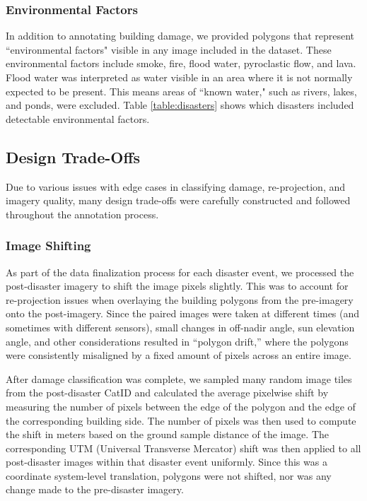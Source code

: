 \documentclass[10pt,twocolumn,letterpaper]{article}
\begin{document}
\vspace{-0.2cm}
\subsubsection{Environmental Factors}
In addition to annotating building damage, we provided polygons that represent ``environmental factors" visible in any image included in the dataset.
These environmental factors include smoke, fire, flood water, pyroclastic flow, and lava.
Flood water was interpreted as water visible in an area where it is not normally expected to  be present.
This means areas of ``known water," such as rivers, lakes, and ponds, were excluded.
Table \ref{table:disasters} shows which disasters included detectable environmental factors.

\subsection{Design Trade-Offs}
Due to various issues with edge cases in classifying damage, re-projection, and imagery quality, many design trade-offs were carefully constructed and followed throughout the annotation process.

\vspace{-0.2cm}
\subsubsection{Image Shifting}
As part of the data finalization process for each disaster event, we processed the post-disaster imagery to shift the image pixels slightly.
This was to account for re-projection issues when overlaying the building polygons from the pre-imagery onto the post-imagery.
Since the paired images were taken at different times (and sometimes with different sensors), small changes in off-nadir angle, sun elevation angle, and other considerations resulted in “polygon drift,” where the polygons were consistently misaligned by a fixed amount of pixels across an entire image.

After damage classification was complete, we sampled many random image tiles from the post-disaster CatID and calculated the average pixelwise shift by measuring the number of pixels between the edge of the polygon and the edge of the corresponding building side.
The number of pixels was then used to compute the shift in meters based on the ground sample distance of the image.
The corresponding UTM (Universal Transverse Mercator) shift was then applied to all post-disaster images within that disaster event uniformly.
Since this was a coordinate system-level translation, polygons were not shifted, nor was any change made to the pre-disaster imagery.
\end{document}
